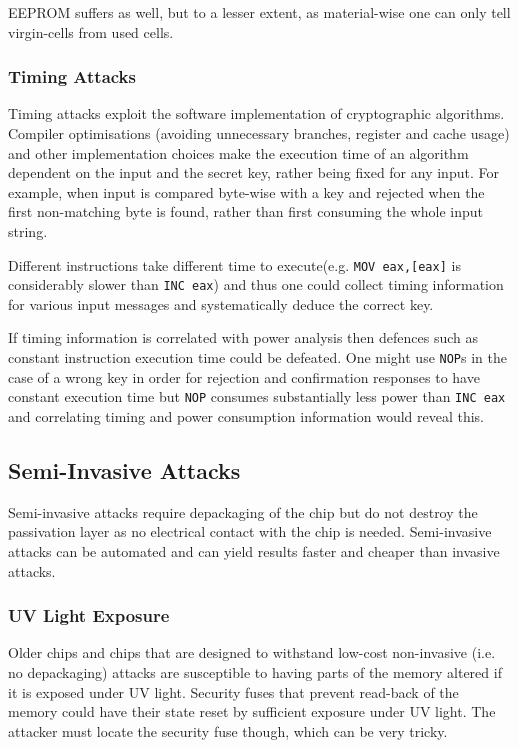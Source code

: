 	EEPROM suffers as well, but to a lesser extent, as material-wise one can only tell virgin-cells from used cells\citep{sergei:thesis}. 
	
	\subsubsection{Timing Attacks}
	Timing attacks exploit the software implementation of cryptographic algorithms. Compiler optimisations (avoiding unnecessary branches, register and cache usage) and other implementation choices make the execution time of an algorithm dependent on the input and the secret key, rather being fixed for any input. For example, when input is compared byte-wise with a key and rejected when the first non-matching byte is found, rather than first consuming the whole input string.
	
	Different instructions take different time to execute(e.g. \texttt{MOV eax,[eax]} is considerably slower than \texttt{INC eax}) and thus one could collect timing information for various input messages and systematically deduce the correct key. 
	
	If timing information is correlated with power analysis then defences such as constant instruction execution time could be defeated. One might use \texttt{NOP}s in the case of a wrong key in order for rejection and confirmation responses to have constant execution time but \texttt{NOP} consumes substantially less power than \texttt{INC eax} and correlating timing and power consumption information would reveal this.

	\subsection{Semi-Invasive Attacks}
	Semi-invasive attacks require depackaging of the chip but do not destroy the passivation layer as no electrical contact with the chip is needed. Semi-invasive attacks can be automated and can yield results faster and cheaper than invasive attacks.
	
	\subsubsection{UV Light Exposure}
	Older chips and chips that are designed to withstand low-cost non-invasive (i.e. no depackaging) attacks are susceptible to having parts of the memory altered if it is exposed under UV light. Security fuses that prevent read-back of the memory could have their state reset by sufficient exposure under UV light. The attacker must locate the security fuse though, which can be very tricky. 

